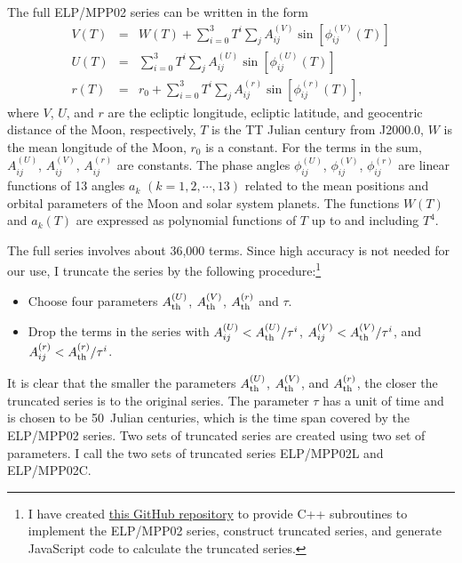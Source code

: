 \documentclass[12pt]{article}
\newcommand \beqn {\begin{eqnarray}}
\newcommand \eeqn {\end{eqnarray}}
\begin{document}
The full ELP/MPP02 series can be written in the form 
\beqn
  V(T) &=& W(T) + \sum_{i=0}^3 T^i \sum_j A^{(V)}_{ij} \sin\left[ \phi^{(V)}_{ij}(T)\right] \\ 
  U(T) &=& \sum_{i=0}^3 T^i \sum_j A^{(U)}_{ij} \sin\left[ \phi^{(U)}_{ij}(T)\right] \\ 
  r(T) &=& r_0 + \sum_{i=0}^3 T^i \sum_j A^{(r)}_{ij} \sin\left[ \phi^{(r)}_{ij}(T)\right] ,
\label{eq:Dmoon}
\eeqn
where $V$, $U$, and $r$ are the ecliptic longitude, ecliptic latitude, and geocentric 
distance of the Moon, respectively, $T$ is the TT Julian century from J2000.0, 
$W$ is the mean longitude of the Moon, $r_0$ is a constant. For the terms in the 
sum, $A^{(U)}_{ij}$, $A^{(V)}_{ij}$, $A^{(r)}_{ij}$ are constants. The phase 
angles $\phi^{(U)}_{ij}$, $\phi^{(V)}_{ij}$, $\phi^{(r)}_{ij}$ are linear functions 
of 13 angles $a_k$ $(k=1,2,\cdots, 13)$ related to the mean positions and orbital 
parameters of the Moon and solar system planets. The functions $W(T)$ and $a_k(T)$ 
are expressed as polynomial functions of $T$ up to and including $T^4$. 

The full series involves about 36,000 terms. Since high accuracy is not 
needed for our use, I truncate the series by the following procedure:\footnote{I 
have created \href{https://github.com/ytliu0/ElpMpp02}{this GitHub repository} to 
provide C++ subroutines to implement the ELP/MPP02 series, construct 
truncated series, and generate JavaScript code to calculate the truncated series.}

\begin{itemize}
\item Choose four parameters $A^{(U)}_{\rm th}$, $A^{(V)}_{\rm th}$, 
$A^{(r)}_{\rm th}$ and $\tau$. 

\item Drop the terms in the series with $A^{(U)}_{ij} < A^{(U)}_{\rm th} /\tau^i$, 
$A^{(V)}_{ij} < A^{(V)}_{\rm th} /\tau^i$, and 
$A^{(r)}_{ij} < A^{(r)}_{\rm th} /\tau^i$.
\end{itemize}

It is clear that the smaller the parameters $A^{(U)}_{\rm th}$, $A^{(V)}_{\rm th}$, 
and $A^{(r)}_{\rm th}$, the closer the truncated series is to the original series. 
The parameter $\tau$ has a unit of time and is chosen to be 50~Julian centuries, 
which is the time span covered by the ELP/MPP02 series. Two sets of truncated 
series are created using two set of parameters. I call the two sets of 
truncated series ELP/MPP02L and ELP/MPP02C.
\end{document}
